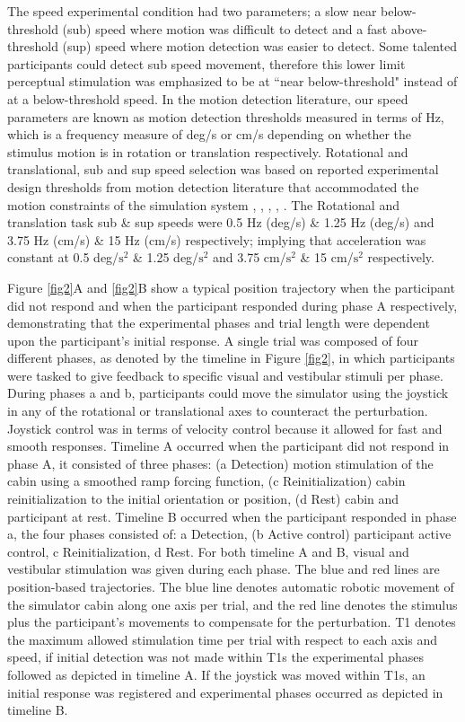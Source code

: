 \documentclass{ieeeaccess}
\begin{document}
\noindent The speed experimental condition had two parameters; a slow near below-threshold (sub) speed where motion was difficult to detect and a fast above-threshold (sup) speed where motion detection was easier to detect. Some talented participants could detect sub speed movement, therefore this lower limit perceptual stimulation was emphasized to be at ``near below-threshold" instead of at a below-threshold speed. In the motion detection literature, our speed parameters are known as motion detection thresholds measured in terms of Hz, which is a frequency measure of deg/s or cm/s depending on whether the stimulus motion is in rotation or translation respectively. Rotational and translational, sub and sup speed selection was based on reported experimental design thresholds from motion detection literature that accommodated the motion constraints of the simulation system \cite{Hartmann_2014_Direction}, \cite{BermudezRey_2016_Vestibular}, \cite{Karmali_2017_Multivariate}, \cite{Valko_2012_Vestibular}, \cite{Melvill_1978_Vertical}. The Rotational and translation task sub \& sup speeds were 0.5 Hz (deg/s) \& 1.25 Hz (deg/s) and 3.75 Hz (cm/s) \& 15 Hz (cm/s) respectively; implying that acceleration was constant at 0.5 deg/$\textrm{s}^{2}$ \& 1.25 deg/$\textrm{s}^{2}$ and 3.75 cm/$\textrm{s}^{2}$ \& 15 cm/$\textrm{s}^{2}$ respectively.

\indent Figure \ref{fig2}A and \ref{fig2}B show a typical position trajectory when the participant did not respond and when the participant responded during phase A respectively, demonstrating that the experimental phases and trial length were dependent upon the participant’s initial response. A single trial was composed of four different phases, as denoted by the timeline in Figure \ref{fig2}, in which participants were tasked to give feedback to specific visual and vestibular stimuli per phase. During phases a and b, participants could move the simulator using the joystick in any of the rotational or translational axes to counteract the perturbation. Joystick control was in terms of velocity control because it allowed for fast and smooth responses. Timeline A occurred when the participant did not respond in phase A, it consisted of three phases: (a Detection) motion stimulation of the cabin using a smoothed ramp forcing function, (c Reinitialization) cabin reinitialization to the initial orientation or position, (d Rest) cabin and participant at rest. Timeline B occurred when the participant responded in phase a, the four phases consisted of: a Detection, (b Active control) participant active control, c Reinitialization, d Rest. For both timeline A and B, visual and vestibular stimulation was given during each phase. The blue and red lines are position-based trajectories. The blue line denotes automatic robotic movement of the simulator cabin along one axis per trial, and the red line denotes the stimulus plus the participant’s movements to compensate for the perturbation. T1 denotes the maximum allowed stimulation time per trial with respect to each axis and speed, if initial detection was not made within T1s the experimental phases followed as depicted in timeline A. If the joystick was moved within T1s, an initial response was registered and experimental phases occurred as depicted in timeline B.
\end{document}
